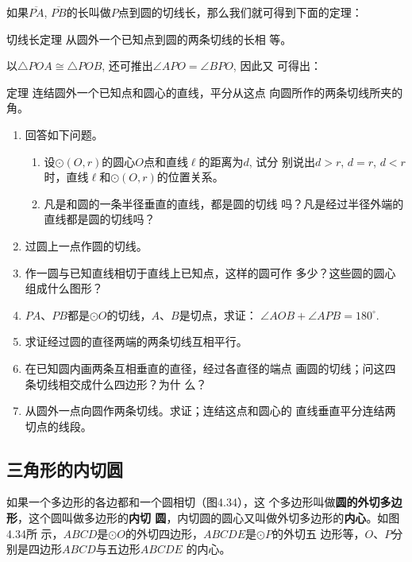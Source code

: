 如果$\overline{PA}$, $\overline{PB}$的长叫做$P$点到圆的切线长，那么我们就可得到下面的定理：

\begin{blk}
    {切线长定理}
从圆外一个已知点到圆的两条切线的长相
等。
\end{blk}

以$\triangle POA\cong \triangle POB$, 还可推出$\angle APO=\angle BPO$, 因此又
可得出：

\begin{blk}
    {定理} 连结圆外一个已知点和圆心的直线，平分从这点
向圆所作的两条切线所夹的角。
\end{blk}

\begin{ex}
\begin{enumerate}
    \item 回答如下问题。
\begin{enumerate}
    \item 设$\odot (O,r)$的圆心$O$点和直线$\ell$的距离为$d$, 试分
    别说出$d>r$, $d=r$, $d<r$时，直线$\ell$和$\odot (O,r)$的位置关系。
    \item 凡是和圆的一条半径垂直的直线，都是圆的切线
    吗？凡是经过半径外端的直线都是圆的切线吗？
\end{enumerate}
    \item 过圆上一点作圆的切线。
    \item 作一圆与已知直线相切于直线上已知点，这样的圆可作
    多少？这些圆的圆心组成什么图形？
    \item $PA$、$PB$都是$\odot O$的切线，$A$、$B$是切点，求证：
    $\angle AOB+\angle APB=180^{\circ}$.
    \item 求证经过圆的直径两端的两条切线互相平行。
    \item 在已知圆内画两条互相垂直的直径，经过各直径的端点
    画圆的切线；问这四条切线相交成什么四边形？为什
    么？
    \item 从圆外一点向圆作两条切线。求证；连结这点和圆心的
    直线垂直平分连结两切点的线段。
\end{enumerate}
\end{ex}

\subsection{三角形的内切圆}
如果一个多边形的各边都和一个圆相切（图4.34），这
个多边形叫做\textbf{圆的外切多边形}，这个圆叫做多边形的\textbf{内切
圆}，内切圆的圆心又叫做外切多边形的\textbf{内心}。如图4.34所
示，$ABCD$是$\odot O$的外切四边形，$ABCDE$是$\odot P$的外切五
边形等，$O$、$P$分别是四边形$ABCD$与五边形$ABCDE$
的内心。

